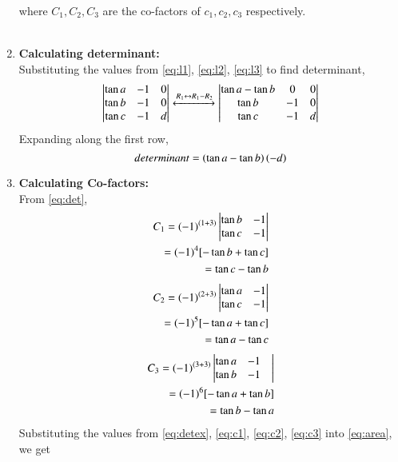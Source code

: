 \documentclass[journal,12pt,twocolumn]{IEEEtran}
\renewcommand\thesection{\arabic{section}}
\begin{document}
\begin{enumerate}[label=\thesection.\arabic*.,ref=\thesection.\theenumi]
where $C_{1},C_{2},C_{3}$ are the co-factors of $c_{1},c_{2},c_{3}$ respectively.\\\\
\item \textbf{Calculating determinant:}\\
Substituting the values from \eqref{eq:l1}, \eqref{eq:l2}, \eqref{eq:l3} to find determinant,
\begin{align}\label{eq:det}
\begin{vmatrix}\tan a& -1 & 0\\ \tan b& -1 & 0\\ \tan c& -1 & d\end{vmatrix} \xleftrightarrow[]{R_{1}\leftrightarrow R_{1}-R_{2}}\begin{vmatrix}\tan a-\tan b& 0 & 0\\ \tan b& -1 & 0\\ \tan c& -1 & d\end{vmatrix}
\end{align}
Expanding along the first row,
\begin{equation}\label{eq:detex}
determinant=\left(\tan a-\tan b\right)\left(-d\right)
\end{equation}
\item \textbf{Calculating Co-factors:}\\
From \eqref{eq:det},
\begin{align}\label{eq:c1}
\begin{split}
C_{1}= (-1)^{(1+3)}\begin{vmatrix}\tan b& -1\\\tan c& -1\end{vmatrix}&\\=(-1)^4[-\tan b + \tan c] &\\=\tan c - \tan b
\end{split}
\end{align}
\begin{align}\label{eq:c2}
\begin{split}
C_{2}= (-1)^{(2+3)}\begin{vmatrix}\tan a& -1\\\tan c& -1\end{vmatrix}&\\=(-1)^5[-\tan a + \tan c] &\\=\tan a - \tan c
\end{split}
\end{align}
\begin{align}\label{eq:c3}
\begin{split}
C_{3}= (-1)^{(3+3)}\begin{vmatrix}\tan a& -1\\\tan b& -1&\\\end{vmatrix}&\\=(-1)^6[-\tan a + \tan b] &\\=\tan b - \tan a
\end{split}
\end{align}
Substituting the values from \eqref{eq:detex}, \eqref{eq:c1}, \eqref{eq:c2}, \eqref{eq:c3} into \eqref{eq:area}, we get

\end{enumerate}
\end{document}

